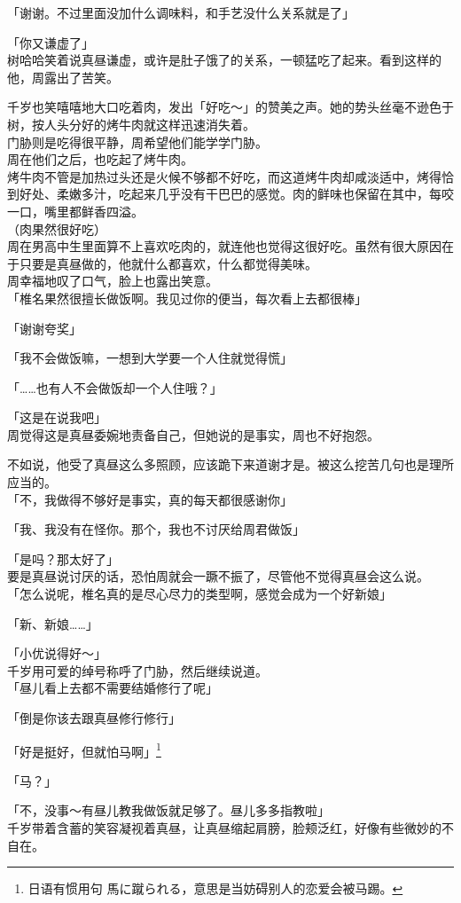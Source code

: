 「谢谢。不过里面没加什么调味料，和手艺没什么关系就是了」

「你又谦虚了」\\

树哈哈笑着说真昼谦虚，或许是肚子饿了的关系，一顿猛吃了起来。看到这样的他，周露出了苦笑。

千岁也笑嘻嘻地大口吃着肉，发出「好吃～」的赞美之声。她的势头丝毫不逊色于树，按人头分好的烤牛肉就这样迅速消失着。\\

门胁则是吃得很平静，周希望他们能学学门胁。\\

周在他们之后，也吃起了烤牛肉。\\

烤牛肉不管是加热过头还是火候不够都不好吃，而这道烤牛肉却咸淡适中，烤得恰到好处、柔嫩多汁，吃起来几乎没有干巴巴的感觉。肉的鲜味也保留在其中，每咬一口，嘴里都鲜香四溢。\\

（肉果然很好吃）\\

周在男高中生里面算不上喜欢吃肉的，就连他也觉得这很好吃。虽然有很大原因在于只要是真昼做的，他就什么都喜欢，什么都觉得美味。\\

周幸福地叹了口气，脸上也露出笑意。\\

「椎名果然很擅长做饭啊。我见过你的便当，每次看上去都很棒」

「谢谢夸奖」

「我不会做饭嘛，一想到大学要一个人住就觉得慌」

「……也有人不会做饭却一个人住哦？」

「这是在说我吧」\\

周觉得这是真昼委婉地责备自己，但她说的是事实，周也不好抱怨。

不如说，他受了真昼这么多照顾，应该跪下来道谢才是。被这么挖苦几句也是理所应当的。\\

「不，我做得不够好是事实，真的每天都很感谢你」

「我、我没有在怪你。那个，我也不讨厌给周君做饭」

「是吗？那太好了」\\

要是真昼说讨厌的话，恐怕周就会一蹶不振了，尽管他不觉得真昼会这么说。\\

「怎么说呢，椎名真的是尽心尽力的类型啊，感觉会成为一个好新娘」

「新、新娘……」

「小优说得好～」\\

千岁用可爱的绰号称呼了门胁，然后继续说道。\\

「昼儿看上去都不需要结婚修行了呢」

「倒是你该去跟真昼修行修行」

「好是挺好，但就怕马啊」\footnote{日语有惯用句 {\jpfont 馬に蹴られる}，意思是当妨碍别人的恋爱会被马踢。}

「马？」

「不，没事～有昼儿教我做饭就足够了。昼儿多多指教啦」\\

千岁带着含蓄的笑容凝视着真昼，让真昼缩起肩膀，脸颊泛红，好像有些微妙的不自在。
